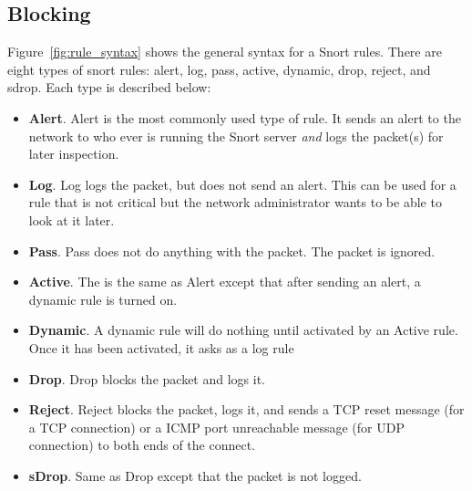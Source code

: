 
\subsection{Blocking}

Figure~\ref{fig:rule_syntax} shows the general syntax for a Snort rules. There are eight types of snort rules: alert, log, pass, active, dynamic, drop, reject, and sdrop. Each type is described below:

\begin{itemize}
    \item \textbf{Alert}.
        Alert is the most commonly used type of rule. It sends an alert to the
        network to who ever is running the Snort server \emph{and} logs the
        packet(s) for later inspection.

    \item \textbf{Log}.
        Log logs the packet, but does not send an alert.  This can be used for
        a rule that is not critical but the network administrator wants to be
        able to look at it later.

    \item \textbf{Pass}.
        Pass does not do anything with the packet. The packet is ignored.

    \item \textbf{Active}.
        The is the same as Alert except that after sending an alert, a dynamic
        rule is turned on.

    \item \textbf{Dynamic}.
        A dynamic rule will do nothing until activated by an Active rule. Once
        it has been activated, it asks as a log rule

    \item \textbf{Drop}.
        Drop blocks the packet and logs it.

    \item \textbf{Reject}.
        Reject blocks the packet, logs it, and sends a TCP reset message (for a
        TCP connection) or a ICMP port unreachable message (for UDP connection)
        to both ends of the connect.

    \item \textbf{sDrop}.
        Same as Drop except that the packet is not logged.
\end{itemize}

